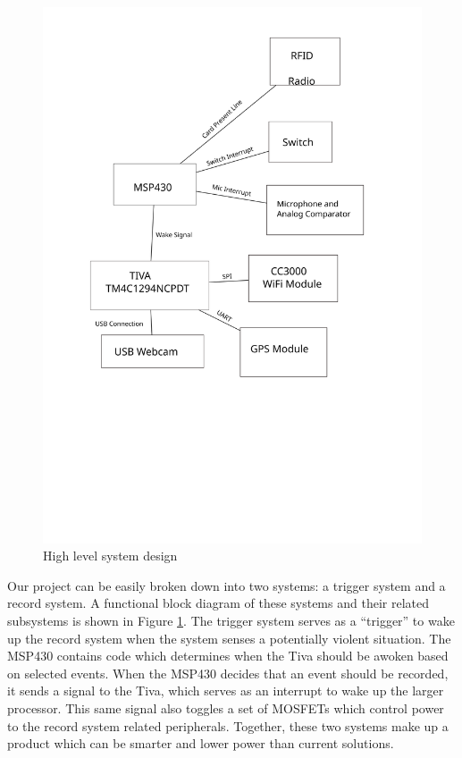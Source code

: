 \documentclass[12pt]{article}
\begin{document}
\begin{figure}[h]
    \centering
    \includegraphics[height=0.35\textheight]{sys_desc}
    \caption{High level system design}
    \label{fig:system_description}
\end{figure}

Our project can be easily broken down into two systems: a trigger system and a
record system. A functional block diagram of these systems and their related
subsystems is shown in Figure \ref{fig:system_description}. The trigger system
serves as a ``trigger'' to wake up the record system when the system senses a
potentially violent situation. The MSP430 contains code which determines when
the Tiva should be awoken based on selected events. When the MSP430 decides
that an event should be recorded, it sends a signal to the Tiva, which serves
as an interrupt to wake up the larger processor. This same signal also toggles
a set of MOSFETs which control power to the record system related peripherals.
Together, these two systems make up a product which can be smarter and lower
power than current solutions.
\end{document}
